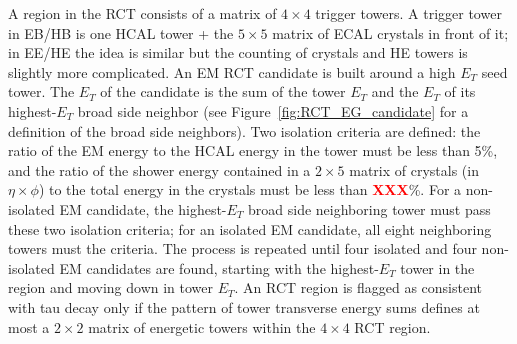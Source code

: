 \documentclass[dissertation.tex]{subfiles}
\begin{document}
A region in the RCT consists of a matrix of $4\times4$ trigger towers.  A trigger tower in EB/HB is one HCAL tower + the $5\times5$ matrix of ECAL crystals in front of it; in EE/HE the idea is similar but the counting of crystals and HE towers is slightly more complicated.  An EM RCT candidate is built around a high $E_{T}$ seed tower.  The $E_{T}$ of the candidate is the sum of the tower $E_{T}$ and the $E_{T}$ of its highest-$E_{T}$ broad side neighbor (see Figure~\ref{fig:RCT_EG_candidate} for a definition of the broad side neighbors).  Two isolation criteria are defined: the ratio of the EM energy to the HCAL energy in the tower must be less than 5\%, and the ratio of the shower energy contained in a $2\times5$ matrix of crystals (in $\eta\times\phi$) to the total energy in the crystals must be less than \textcolor{red}{\textbf{XXX}}\%.  For a non-isolated EM candidate, the highest-$E_{T}$ broad side neighboring tower must pass these two isolation criteria; for an isolated EM candidate, all eight neighboring towers must the criteria.  The process is repeated until four isolated and four non-isolated EM candidates are found, starting with the highest-$E_{T}$ tower in the region and moving down in tower $E_{T}$.  An RCT region is flagged as consistent with tau decay only if the pattern of tower transverse energy sums defines at most a $2\times2$ matrix of energetic towers within the $4\times4$ RCT region.
\end{document}

